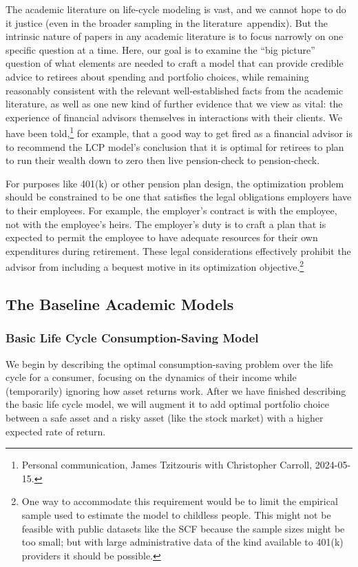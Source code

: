 \documentclass{article}
\begin{document}
The academic literature on life-cycle modeling is vast, and we cannot hope to do it justice (even in the broader sampling in the literature~appendix).
But the intrinsic nature of papers in any academic literature is to focus narrowly on one specific question at a time.
Here, our goal is to examine the ``big picture'' question of what elements are needed to craft a model that can provide credible advice to retirees about spending and portfolio choices, while remaining reasonably consistent with the relevant well-established facts from the academic literature, as well as one new kind of further evidence that we view as vital: the experience of financial advisors themselves in interactions with their clients.
We have been told,\footnote{Personal communication, James Tzitzouris with Christopher Carroll, 2024-05-15.} for example, that a good way to get fired as a financial advisor is to recommend the LCP model's conclusion that it is optimal for retirees to plan to run their wealth down to zero then live pension-check to pension-check.

For purposes like 401(k) or other pension plan design, the optimization problem should be constrained to be one that satisfies the legal obligations employers have to their employees.
For example, the employer's contract is with the employee, not with the employee's heirs.
The employer's duty is to craft a plan that is expected to permit the employee to have adequate resources for their own expenditures during retirement.
These legal considerations effectively prohibit the advisor from including a bequest motive in its optimization objective.\footnote{One way to accommodate this requirement would be to limit the empirical sample used to estimate the model to childless people.
This might not be feasible with public datasets like the SCF because the sample sizes might be too small; but with large administrative data of the kind available to 401(k) providers it should be possible.}

\subsection{The Baseline Academic Models}

\subsubsection{Basic Life Cycle Consumption-Saving Model}

We begin by describing the optimal consumption-saving problem over the life cycle for a consumer, focusing on the dynamics of their income while (temporarily) ignoring how asset returns work.
After we have finished describing the basic life cycle model, we will augment it to add optimal portfolio choice between a safe asset and a risky asset (like the stock market) with a higher expected rate of return.
\end{document}

